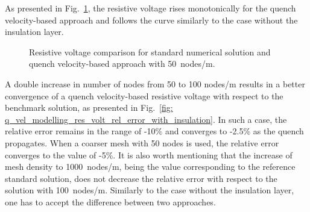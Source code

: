 As presented in Fig.~\ref{fig: q_vel_modelling_res_volt_benchmarking_with_insulation}, the resistive voltage rises monotonically for the quench velocity-based approach and follows the curve similarly to the case without the insulation layer. 

\begin{figure}[H]
\centering
    \caption{Resistive voltage comparison for standard numerical solution and quench velocity-based approach with 50~nodes/m.}
    \label{fig: q_vel_modelling_res_volt_benchmarking_with_insulation}
\end{figure}

A double increase in number of nodes from 50 to 100 nodes/m results in a better convergence of a quench velocity-based resistive voltage with respect to the benchmark solution, as presented in Fig.~\ref{fig: q_vel_modelling_res_volt_rel_error_with_insulation}. In such a case, the relative error remains in the range of -10\% and converges to -2.5\% as the quench propagates. When a coarser mesh with 50 nodes is used, the relative error converges to the value of -5\%. It is also worth mentioning that the increase of mesh density to 1000~nodes/m, being the value corresponding to the reference standard solution, does not decrease the relative error with respect to the solution with 100~nodes/m. Similarly to the case without the insulation layer, one has to accept the difference between two approaches.

